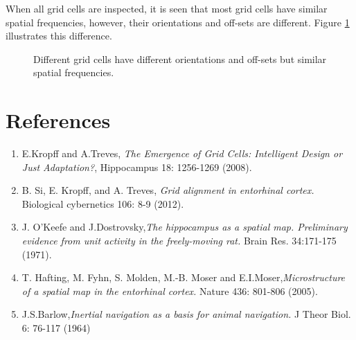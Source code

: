 \documentclass[a4paper, 12pt]{article}
\begin{document}
When all grid cells are inspected, it is seen that most grid cells have similar spatial frequencies, however, their orientations and off-sets are different. Figure \ref{diff} illustrates this difference. 

\begin{figure}
\hfill
{}
\hfill
{}
\hfill
\caption{Different grid cells have different orientations and off-sets but similar spatial frequencies.}
\label{diff}
\end{figure}
%
%
%

\newpage
\section{References}
\begin{enumerate}
\item E.Kropff and A.Treves, \textit{The Emergence of Grid Cells: Intelligent Design or Just Adaptation?}, Hippocampus 18: 1256-1269 (2008).

\item B. Si, E. Kropff, and A. Treves, \textit{Grid alignment in entorhinal cortex.} Biological cybernetics 106: 8-9 (2012).

\item J. O'Keefe and J.Dostrovsky,\textit{The hippocampus as a spatial map. Preliminary evidence from unit activity in the freely-moving rat.} Brain Res. 34:171-175 (1971). 

\item T. Hafting, M. Fyhn, S. Molden, M.-B. Moser and E.I.Moser,\textit{Microstructure of a spatial map in the entorhinal cortex.} Nature 436: 801-806 (2005).

\item J.S.Barlow,\textit{Inertial navigation as a basis for animal navigation.} J Theor Biol. 6:  76-117 (1964)
\end{enumerate}
\end{document}

